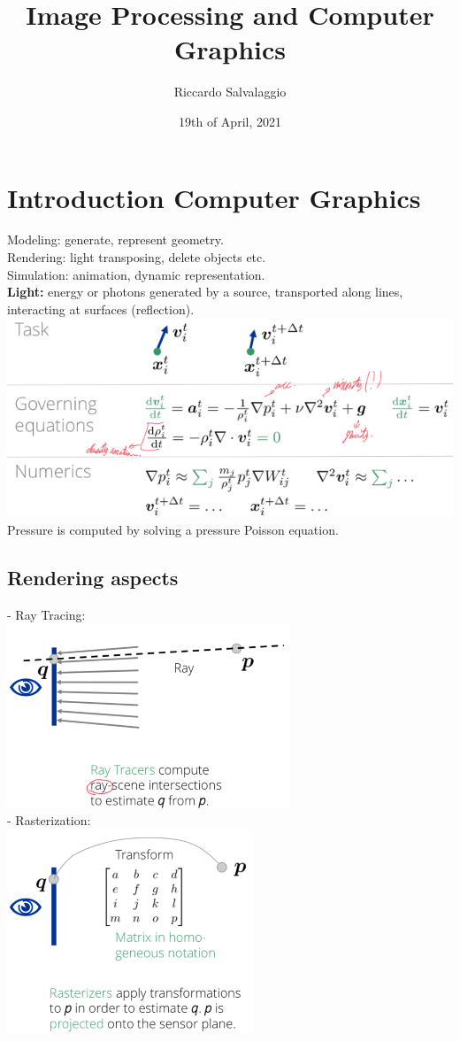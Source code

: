 \documentclass{article}
\title{Image Processing and Computer Graphics}
\author{Riccardo Salvalaggio}
\date{19th of April, 2021}
\begin{document}
\maketitle
\newpage
\tableofcontents
\newpage

\section{Introduction Computer Graphics}
Modeling: generate, represent geometry.\\
Rendering: light transposing, delete objects etc.\\
Simulation: animation, dynamic representation.\\

\textbf{Light:} energy or photons generated by a source, transported along lines, interacting at surfaces (reflection).\\
\includegraphics{image1.png}
Pressure is computed by solving a pressure Poisson equation.

\subsection{Rendering aspects}
- Ray Tracing: \\
\includegraphics{image4.png}\\
- Rasterization: \\
\includegraphics{image5.png}
\end{document}

